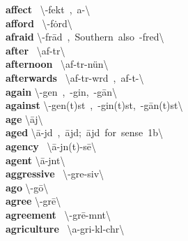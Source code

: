 \documentclass[10pt,a4paper]{article}
\begin{document}
\begin{multicols}{2}
\textbf{ affect }\quad \ \textbackslash \textschwa -\textprimstress fekt\ ,\ a-\textbackslash \\
\textbf{ afford }\quad \ \textbackslash \textschwa -\textprimstress f\.{o}rd\textbackslash \\
\textbf{ afraid }\quad \textbackslash \textschwa -\textprimstress fr\={a}d\ ,\ Southern\ also\ \textschwa -\textprimstress fred\textbackslash \\
\textbf{ after }\quad \ \textbackslash \textprimstress af-t\textschwa r\textbackslash \\
\textbf{ afternoon }\quad \ \textbackslash \textsecstress af-t\textschwa r-\textprimstress n\"{u}n\textbackslash \\
\textbf{ afterwards }\quad \ \textbackslash \textprimstress af-t\textschwa r-w\textschwa rd\ ,\ \textprimstress af-t\textschwa -\textbackslash \\
\textbf{ again }\quad \textbackslash \textschwa -\textprimstress gen\ ,\ -\textprimstress gin,\ -\textprimstress g\={a}n\textbackslash \\
\textbf{ against }\quad \textbackslash \textschwa -\textprimstress gen(t)st\ ,\ -\textprimstress gin(t)st,\ -\textprimstress g\={a}n(t)st\textbackslash \\
\textbf{ age }\quad \textbackslash \textprimstress \={a}j\textbackslash \\
\textbf{ aged }\quad \textbackslash \textprimstress \={a}-j\textschwa d\ ,\ \textprimstress \={a}jd;\ \textprimstress \={a}jd\ for\ sense\ 1b\textbackslash \\
\textbf{ agency }\quad \ \textbackslash \textprimstress \={a}-j\textschwa n(t)-s\={e}\textbackslash \\
\textbf{ agent }\quad \textbackslash \textprimstress \={a}-j\textschwa nt\textbackslash \\
\textbf{ aggressive }\quad \ \textbackslash \textschwa -\textprimstress gre-siv\textbackslash \\
\textbf{ ago }\quad \textbackslash \textschwa -\textprimstress g\={o}\textbackslash \\
\textbf{ agree }\quad \textbackslash \textschwa -\textprimstress gr\={e}\textbackslash \\
\textbf{ agreement }\quad \ \textbackslash \textschwa -\textprimstress gr\={e}-m\textschwa nt\textbackslash \\
\textbf{ agriculture }\quad \ \textbackslash \textprimstress a-gri-\textsecstress k\textschwa l-ch\textschwa r\textbackslash \\

\end{multicols}
\end{document}
